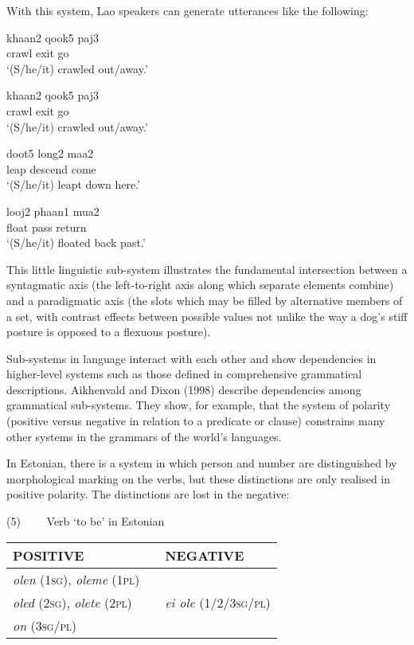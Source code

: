 With this system, Lao speakers can generate utterances like the 
following:

\ea
\gll khaan2 qook5 paj3 \\
     crawl  exit  go\\
\glt \textquoteleft (S/he/it) crawled out/away.'
\z

\ea
\gll khaan2 qook5 paj3 \\
     crawl  exit  go \\
\glt \textquoteleft (S/he/it) crawled out/away.'
\z

\ea
\gll doot5 long2 maa2 \\
     leap descend come \\
\glt \textquoteleft (S/he/it) leapt down here.'
\z

\ea
\gll looj2 phaan1 mua2 \\
     float pass return \\
\glt \textquoteleft (S/he/it) floated back past.'
\z


This little linguistic sub-system illustrates the fundamental 
intersection between a syntagmatic axis (the left-to-right axis along 
which separate elements combine) and a paradigmatic axis (the slots 
which may be filled by alternative members of a set, with contrast 
effects between possible values not unlike the way a dog's stiff posture 
is opposed to a flexuous posture). 



Sub-systems in language interact with each other and show dependencies 
in higher-level systems such as those defined in comprehensive 
grammatical descriptions. Aikhenvald and Dixon (1998) describe 
dependencies among grammatical sub-systems. They show, for example, that 
the system of polarity (positive versus negative in relation to a 
predicate or clause) constrains many other systems in the grammars of 
the world's languages. 



In Estonian, there is a system in which person and number are 
distinguished by morphological marking on the verbs, but these 
distinctions are only realised in positive polarity. The distinctions 
are lost in the negative:



(5) \ \ \ \ Verb \textquoteleft to be' in Estonian



\begin{table}[h]
\centering
\begin{tabular}{|l|l|l|}
\hline
POSITIVE & & NEGATIVE \\
\hline
\textit{olen} (\textsc{1sg)}, \textit{oleme} (\textsc{1pl}) 
& & \\
\hline
\textit{oled} (\textsc{2sg)}, \textit{olete }(\textsc{2pl)} & 
& \textit{ei ole} (1/2/3\textsc{sg/pl}) \\
\hline
\textit{on} (\textsc{3sg/pl}) & & \\
\hline
\end{tabular}
\end{table}


